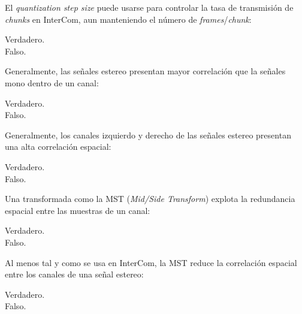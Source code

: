 \documentclass[legalpaper, 12pt, addpoints]{exam}
\begin{document}
\begin{questions}
\vspace{0.10in}

\question El \emph{quantization step size} puede usarse para controlar la
tasa de transmisión de \emph{chunks} en InterCom, aun manteniendo el
número de \emph{frames}/\emph{chunk}:

\begin{oneparchoices}
  \choice Verdadero.\\
  \choice Falso.
\end{oneparchoices}
  
\vspace{0.10in}

\question Generalmente, las señales estereo presentan mayor
correlación que la señales mono dentro de un canal:

\begin{oneparchoices}
  \choice Verdadero.\\
  \choice Falso.
\end{oneparchoices}
  
\vspace{0.10in}

\question Generalmente, los canales izquierdo y derecho de las señales
estereo presentan una alta correlación espacial:

\begin{oneparchoices}
  \choice Verdadero.\\
  \choice Falso.
\end{oneparchoices}
  
\vspace{0.10in}

\question Una transformada como la MST (\emph{Mid/Side Transform}) explota la
redundancia espacial entre las muestras de un canal:

\begin{oneparchoices}
  \choice Verdadero.\\
  \choice Falso.
\end{oneparchoices}
  
\vspace{0.10in}

\question Al menos tal y como se usa en InterCom, la MST reduce la
correlación espacial entre los canales de una señal estereo:

\begin{oneparchoices}
  \choice Verdadero.\\
  \choice Falso.
\end{oneparchoices}
  
\vspace{0.10in}


\end{questions}
\end{document}
